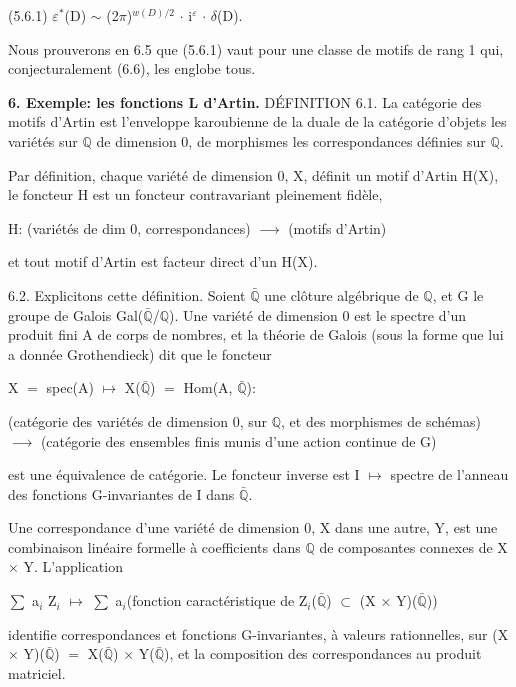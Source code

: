 \documentclass[10pt,twoside]{article}
\newcommand{\SectionLead}[1]{\textbf{\color{D030Accent}#1}}
\begin{document}
(5.6.1)    \ensuremath{ε}\ensuremath{^{*}}(D) \ensuremath{∼} (2\ensuremath{π})\ensuremath{^{w(D)/2}} \ensuremath{·} i\ensuremath{^{ε}} \ensuremath{·} \ensuremath{δ}(D).\par
Nous prouverons en 6.5 que (5.6.1) vaut pour une classe de motifs de rang 1 qui, conjecturalement (6.6), les englobe tous.\par
\SectionLead{6. Exemple: les fonctions L d’Artin.} DÉFINITION 6.1. La catégorie des motifs d’Artin est l’enveloppe karoubienne de la duale de la catégorie d’objets les variétés sur \ensuremath{ℚ} de dimension 0, de morphismes les correspondances définies sur \ensuremath{ℚ}.\par
Par définition, chaque variété de dimension 0, X, définit un motif d’Artin H(X), le foncteur H est un foncteur contravariant pleinement fidèle,\par
H: (variétés de dim 0, correspondances) \ensuremath{⟶} (motifs d’Artin)\par
et tout motif d’Artin est facteur direct d’un H(X).\par
6.2. Explicitons cette définition. Soient \ensuremath{\bar{ℚ}} une clôture algébrique de \ensuremath{ℚ}, et G le groupe de Galois Gal(\ensuremath{\bar{ℚ}}/\ensuremath{ℚ}). Une variété de dimension 0 est le spectre d’un produit fini A de corps de nombres, et la théorie de Galois (sous la forme que lui a donnée Grothendieck) dit que le foncteur\par
X \ensuremath{=} spec(A) \ensuremath{↦} X(\ensuremath{\bar{ℚ}}) \ensuremath{=} Hom(A, \ensuremath{\bar{ℚ}}):\par
(catégorie des variétés de dimension 0, sur \ensuremath{ℚ}, et des morphismes de schémas) \ensuremath{⟶} (catégorie des ensembles finis munis d’une action continue de G)\par
est une équivalence de catégorie. Le foncteur inverse est I \ensuremath{↦} spectre de l’anneau des fonctions G-invariantes de I dans \ensuremath{\bar{ℚ}}.\par
Une correspondance d’une variété de dimension 0, X dans une autre, Y, est une combinaison linéaire formelle à coefficients dans \ensuremath{ℚ} de composantes connexes de X \ensuremath{×} Y. L’application\par
\ensuremath{∑} a\ensuremath{_{i}} Z\ensuremath{_{i}} \ensuremath{↦} \ensuremath{∑} a\ensuremath{_{i}}(fonction caractéristique de Z\ensuremath{_{i}}(\ensuremath{\bar{ℚ}}) \ensuremath{⊂} (X \ensuremath{×} Y)(\ensuremath{\bar{ℚ}}))\par
identifie correspondances et fonctions G-invariantes, à valeurs rationnelles, sur (X \ensuremath{×} Y)(\ensuremath{\bar{ℚ}}) \ensuremath{=} X(\ensuremath{\bar{ℚ}}) \ensuremath{×} Y(\ensuremath{\bar{ℚ}}), et la composition des correspondances au produit matriciel.\par
\end{document}
